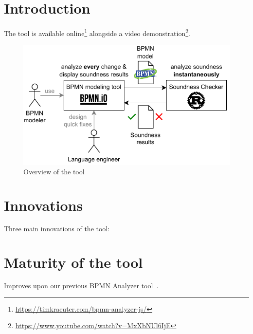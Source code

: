 \documentclass[
twocolumn,
]{ceurart}
\begin{document}
\section{Introduction}
The tool is available online\footnote{\url{https://timkraeuter.com/bpmn-analyzer-js/}} alongside a video demonstration\footnote{\url{https://www.youtube.com/watch?v=MxXbNUl6IjE}}.

\begin{figure}[ht]
	\centering
	\includegraphics[width=\linewidth]{images/overview}
	\caption{Overview of the tool}
	\label{fig:overview}
\end{figure}

\section{Innovations} %
Three main innovations of the tool:

\section{Maturity of the tool}
Improves upon our previous BPMN Analyzer tool~\cite{krauterFormalizationAnalysisBPMN2023}.


\end{document}
